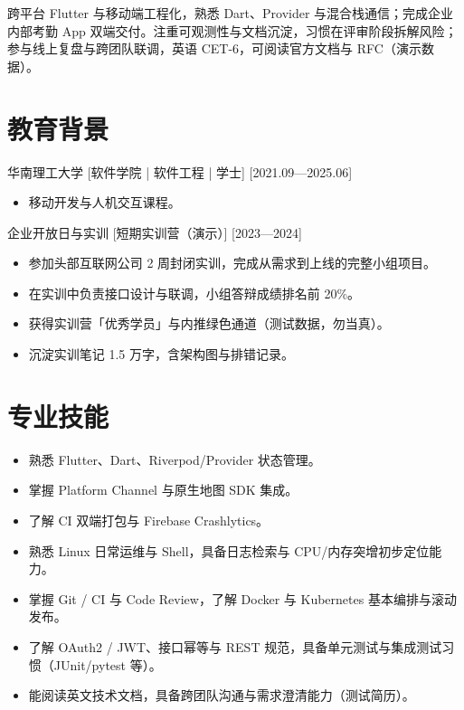 \documentclass{resume-photo}
\begin{document}

\ResumeTitle

\noindent 跨平台 Flutter 与移动端工程化，熟悉 Dart、Provider 与混合栈通信；完成企业内部考勤 App 双端交付。注重可观测性与文档沉淀，习惯在评审阶段拆解风险；参与线上复盘与跨团队联调，英语 CET-6，可阅读官方文档与 RFC（演示数据）。

\section{教育背景}
\ResumeItem
{华南理工大学}
[\textnormal{软件学院 | 软件工程 | 学士}]
[2021.09—2025.06]

\begin{itemize}
  \item 移动开发与人机交互课程。
\end{itemize}


\ResumeItem
{企业开放日与实训}
[\textnormal{短期实训营（演示）}]
[2023—2024]

\begin{itemize}
  \item 参加头部互联网公司 2 周封闭实训，完成从需求到上线的完整小组项目。
  \item 在实训中负责接口设计与联调，小组答辩成绩排名前 20\%。
  \item 获得实训营「优秀学员」与内推绿色通道（测试数据，勿当真）。
  \item 沉淀实训笔记 1.5 万字，含架构图与排错记录。
\end{itemize}



\section{专业技能}
\begin{itemize}
  \item 熟悉 Flutter、Dart、Riverpod/Provider 状态管理。
  \item 掌握 Platform Channel 与原生地图 SDK 集成。
  \item 了解 CI 双端打包与 Firebase Crashlytics。
  \item 熟悉 Linux 日常运维与 Shell，具备日志检索与 CPU/内存突增初步定位能力。
  \item 掌握 Git / CI 与 Code Review，了解 Docker 与 Kubernetes 基本编排与滚动发布。
  \item 了解 OAuth2 / JWT、接口幂等与 REST 规范，具备单元测试与集成测试习惯（JUnit/pytest 等）。
  \item 能阅读英文技术文档，具备跨团队沟通与需求澄清能力（测试简历）。
\end{itemize}
\end{document}
